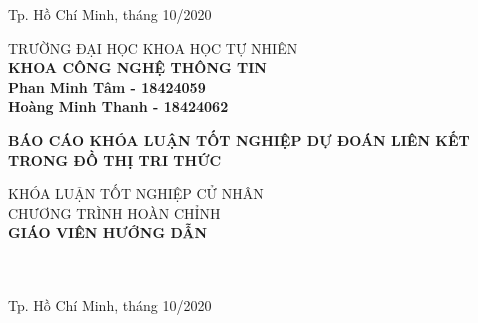 \begin{titlepage}
\begin{center}
\vfill
Tp. Hồ Chí Minh, tháng 10/2020

\end{center}

\pagebreak



\begin{center}

TRƯỜNG ĐẠI HỌC KHOA HỌC TỰ NHIÊN\\
\textbf{KHOA CÔNG NGHỆ THÔNG TIN}\\[2cm]


{\large \bfseries Phan Minh Tâm - 18424059\\} 
{\large \bfseries Hoàng Minh Thanh - 18424062\\[2cm]}


{ \Large \bfseries  BÁO CÁO KHÓA LUẬN TỐT NGHIỆP DỰ ĐOÁN LIÊN KẾT TRONG ĐỒ THỊ TRI THỨC\\[2cm] } 


\large KHÓA LUẬN TỐT NGHIỆP CỬ NHÂN\\
\large CHƯƠNG TRÌNH HOÀN CHỈNH\\[2cm]

\textbf{GIÁO VIÊN HƯỚNG DẪN}\\
\tenGVHD\\
\tenBM\\


\vfill
Tp. Hồ Chí Minh, tháng 10/2020

\end{center}

\end{titlepage}